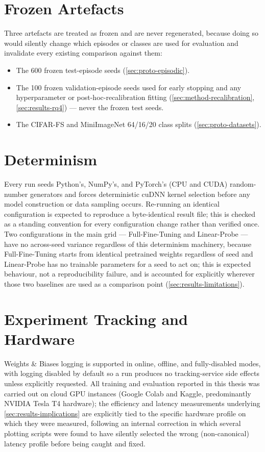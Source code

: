\documentclass{iutbscthesis}
\begin{document}
\begin{appendices}
\section{Frozen Artefacts}

Three artefacts are treated as frozen and are never regenerated, because doing so would silently change which episodes or classes are used for evaluation and invalidate every existing comparison against them:

\begin{itemize}
    \item The 600 frozen test-episode seeds (\autoref{sec:proto-episodic}).
    \item The 100 frozen validation-episode seeds used for early stopping and any hyperparameter or post-hoc-recalibration fitting (\autoref{sec:method-recalibration}, \autoref{sec:results-rq4}) — never the frozen test seeds.
    \item The CIFAR-FS and MiniImageNet 64/16/20 class splits (\autoref{sec:proto-datasets}).
\end{itemize}

\section{Determinism}

Every run seeds Python's, NumPy's, and PyTorch's (CPU and CUDA) random-number generators and forces deterministic cuDNN kernel selection before any model construction or data sampling occurs. Re-running an identical configuration is expected to reproduce a byte-identical result file; this is checked as a standing convention for every configuration change rather than verified once. Two configurations in the main grid — Full-Fine-Tuning and Linear-Probe — have no across-seed variance regardless of this determinism machinery, because Full-Fine-Tuning starts from identical pretrained weights regardless of seed and Linear-Probe has no trainable parameters for a seed to act on; this is expected behaviour, not a reproducibility failure, and is accounted for explicitly wherever those two baselines are used as a comparison point (\autoref{sec:results-limitations}).

\section{Experiment Tracking and Hardware}

Weights \& Biases logging is supported in online, offline, and fully-disabled modes, with logging disabled by default so a run produces no tracking-service side effects unless explicitly requested. All training and evaluation reported in this thesis was carried out on cloud GPU instances (Google Colab and Kaggle, predominantly NVIDIA Tesla T4 hardware); the efficiency and latency measurements underlying \autoref{sec:results-implications} are explicitly tied to the specific hardware profile on which they were measured, following an internal correction in which several plotting scripts were found to have silently selected the wrong (non-canonical) latency profile before being caught and fixed.

\end{appendices}
\end{document}
